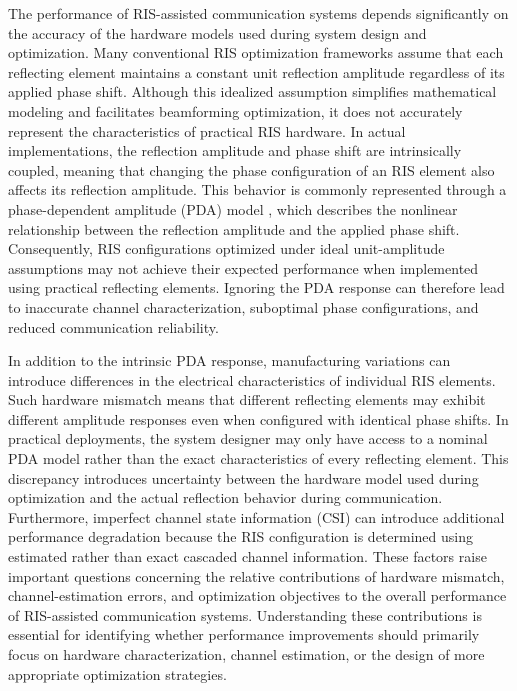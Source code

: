 \documentclass[journal]{IEEEtran}
\begin{document}
The performance of RIS-assisted communication systems depends significantly on the accuracy of the hardware models used during system design and optimization. Many conventional RIS optimization frameworks assume that each reflecting element maintains a constant unit reflection amplitude regardless of its applied phase shift. Although this idealized assumption simplifies mathematical modeling and facilitates beamforming optimization, it does not accurately represent the characteristics of practical RIS hardware. In actual implementations, the reflection amplitude and phase shift are intrinsically coupled, meaning that changing the phase configuration of an RIS element also affects its reflection amplitude. This behavior is commonly represented through a phase-dependent amplitude (PDA) model \cite{abeywickrama2020intelligent}, which describes the nonlinear relationship between the reflection amplitude and the applied phase shift. Consequently, RIS configurations optimized under ideal unit-amplitude assumptions may not achieve their expected performance when implemented using practical reflecting elements. Ignoring the PDA response can therefore lead to inaccurate channel characterization, suboptimal phase configurations, and reduced communication reliability.

In addition to the intrinsic PDA response, manufacturing variations can introduce differences in the electrical characteristics of individual RIS elements. Such hardware mismatch means that different reflecting elements may exhibit different amplitude responses even when configured with identical phase shifts. In practical deployments, the system designer may only have access to a nominal PDA model rather than the exact characteristics of every reflecting element. This discrepancy introduces uncertainty between the hardware model used during optimization and the actual reflection behavior during communication. Furthermore, imperfect channel state information (CSI) can introduce additional performance degradation because the RIS configuration is determined using estimated rather than exact cascaded channel information. These factors raise important questions concerning the relative contributions of hardware mismatch, channel-estimation errors, and optimization objectives to the overall performance of RIS-assisted communication systems. Understanding these contributions is essential for identifying whether performance improvements should primarily focus on hardware characterization, channel estimation, or the design of more appropriate optimization strategies.
\end{document}
